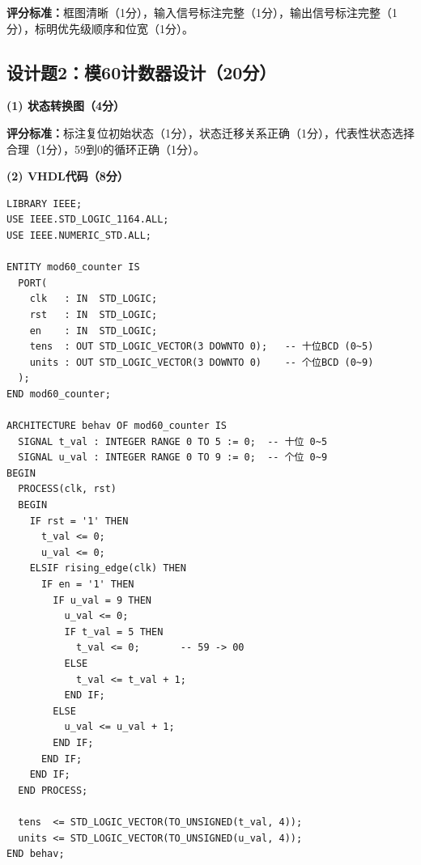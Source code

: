 \textbf{评分标准：}框图清晰（1分），输入信号标注完整（1分），输出信号标注完整（1分），标明优先级顺序和位宽（1分）。

\subsection{设计题2：模60计数器设计（20分）}

\textbf{(1) 状态转换图（4分）}

\begin{center}
\end{center}

\textbf{评分标准：}标注复位初始状态（1分），状态迁移关系正确（1分），代表性状态选择合理（1分），59到0的循环正确（1分）。

\vspace{0.3cm}

\textbf{(2) VHDL代码（8分）}

\begin{lstlisting}[caption={模60计数器VHDL代码}]
LIBRARY IEEE;
USE IEEE.STD_LOGIC_1164.ALL;
USE IEEE.NUMERIC_STD.ALL;

ENTITY mod60_counter IS
  PORT(
    clk   : IN  STD_LOGIC;
    rst   : IN  STD_LOGIC;
    en    : IN  STD_LOGIC;
    tens  : OUT STD_LOGIC_VECTOR(3 DOWNTO 0);   -- 十位BCD (0~5)
    units : OUT STD_LOGIC_VECTOR(3 DOWNTO 0)    -- 个位BCD (0~9)
  );
END mod60_counter;

ARCHITECTURE behav OF mod60_counter IS
  SIGNAL t_val : INTEGER RANGE 0 TO 5 := 0;  -- 十位 0~5
  SIGNAL u_val : INTEGER RANGE 0 TO 9 := 0;  -- 个位 0~9
BEGIN
  PROCESS(clk, rst)
  BEGIN
    IF rst = '1' THEN
      t_val <= 0;
      u_val <= 0;
    ELSIF rising_edge(clk) THEN
      IF en = '1' THEN
        IF u_val = 9 THEN
          u_val <= 0;
          IF t_val = 5 THEN
            t_val <= 0;       -- 59 -> 00
          ELSE
            t_val <= t_val + 1;
          END IF;
        ELSE
          u_val <= u_val + 1;
        END IF;
      END IF;
    END IF;
  END PROCESS;

  tens  <= STD_LOGIC_VECTOR(TO_UNSIGNED(t_val, 4));
  units <= STD_LOGIC_VECTOR(TO_UNSIGNED(u_val, 4));
END behav;
\end{lstlisting}

